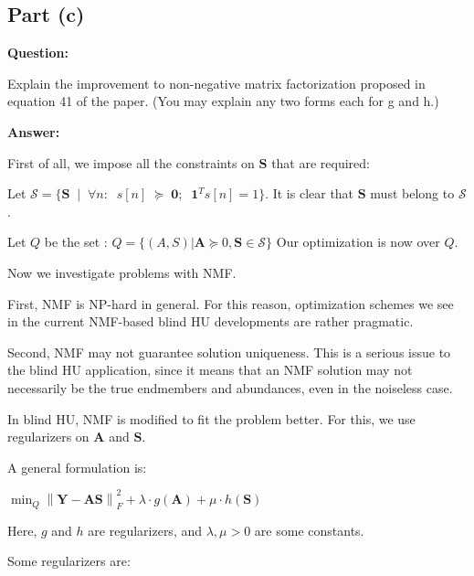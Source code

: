 \documentclass[fleqn, 11pt]{article}
\newcommand{\bs}[1]{\boldsymbol{#1}}
\newcommand\norm[1]{\left\lVert#1\right\rVert}
\begin{document}
\bigskip


\subsection*{Part (c)}

\textbf{Question: }

\smallskip

Explain the improvement to non-negative matrix factorization proposed in equation 41 of the paper.
(You may explain any two forms each for g and h.)

\hrulefill

\medskip

\textbf{Answer: }

\smallskip

First of all, we impose all the constraints 
on $\bs{S}$ that are required:

Let $\mathcal{S}=\{ \bs{S} \;\; | \;\; \forall n:  \;\; s[n] \; \succeq \; \bs{0} ;  \;\;
\bs{1}^Ts[n]=1    \}$. 
It is clear that $\bs{S}$ must belong 
to $\mathcal{S}$. 

\medskip

Let $Q$ be the set :
$Q = \{ (A,S) |  \bs{A} \succeq {0}, 
\bs{S} \in \mathcal{S}\}$
Our optimization is now over $Q$. 

\medskip

Now we investigate problems with NMF. 

First, NMF is NP-hard in general. 
For this reason, optimization schemes we see 
in the current NMF-based blind HU
developments are rather pragmatic.

Second, NMF may not guarantee solution uniqueness.
This is a serious issue to the blind 
HU application, 
since it means that an NMF solution may not necessarily 
be the true endmembers and abundances, 
even in the noiseless case.

In blind HU, NMF is modified to fit 
the problem better. For this, we use regularizers 
on $\bs{A}$ and $\bs{S}$.

\medskip

A general formulation is: 
\begin{center}
    $\displaystyle \min_{Q} \norm{\bs{Y-AS}}^2_F
    + \lambda \cdot g(\bs{A}) 
    + \mu \cdot h(\bs{S})$
\end{center}

Here, $g$ and $h$
are regularizers, and
$ \lambda , \mu > 0 $  are some constants.

Some regularizers are: 
\end{document}
